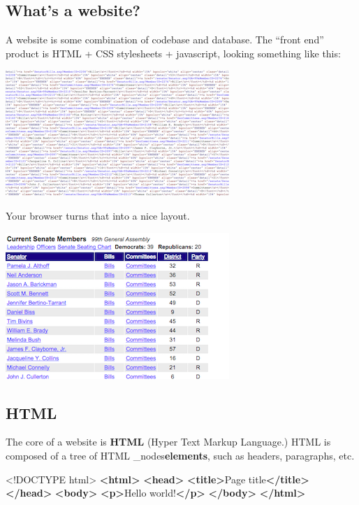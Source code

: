 \documentclass[]{book}
\newenvironment{Shaded}{\begin{snugshade}}{\end{snugshade}}
\newcommand{\DataTypeTok}[1]{\textcolor[rgb]{0.13,0.29,0.53}{#1}}
\newcommand{\KeywordTok}[1]{\textcolor[rgb]{0.13,0.29,0.53}{\textbf{#1}}}
\newcommand{\NormalTok}[1]{#1}
\begin{document}
\hypertarget{whats-a-website}{%
\subsection{What's a website?}\label{whats-a-website}}

A website is some combination of codebase and database. The ``front end'' product is HTML + CSS stylesheets + javascript, looking something like this:

\begin{center}\includegraphics[width=0.7\linewidth]{img/html} \end{center}

Your browser turns that into a nice layout.

\begin{center}\includegraphics[width=0.7\linewidth]{img/layout} \end{center}

\hypertarget{html}{%
\subsection{HTML}\label{html}}

The core of a website is \textbf{HTML} (Hyper Text Markup Language.) HTML is composed of a tree of HTML \_nodes\textbf{elements}, such as headers, paragraphs, etc.

\begin{Shaded}
\begin{Highlighting}[]
\DataTypeTok{<!DOCTYPE }\NormalTok{html}\DataTypeTok{>}
\KeywordTok{<html>}
    \KeywordTok{<head>}
        \KeywordTok{<title>}\NormalTok{Page title}\KeywordTok{</title>}
    \KeywordTok{</head>}
    \KeywordTok{<body>}
        \KeywordTok{<p>}\NormalTok{Hello world!}\KeywordTok{</p>}
    \KeywordTok{</body>}
\KeywordTok{</html>}
\end{Highlighting}
\end{Shaded}
\end{document}
